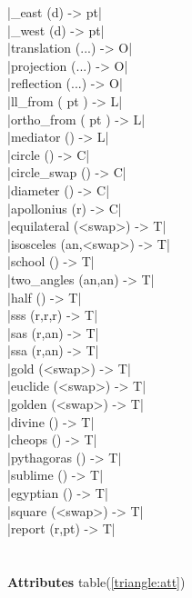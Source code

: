 \documentclass[DIV         = 14,
               fontsize    = 10,
               index       = totoc,
               twoside,
               cadre,
               headings    = small
               ]{tkz-doc}
\begin{document}
\begin{multicols}{3}
|_east (d)                 -> pt|  \\
|_west (d)                 -> pt|  \\                 
|translation (...)         -> O|   \\
|projection (...)          -> O|   \\
|reflection (...)          -> O|   \\
|ll_from ( pt )            -> L|   \\
|ortho_from ( pt )         -> L|   \\
|mediator ()               -> L|   \\
|circle ()                 -> C|   \\
|circle_swap ()            -> C|   \\
|diameter ()               -> C|   \\
|apollonius (r)            -> C|   \\                     
|equilateral (<swap>)      -> T|   \\
|isosceles (an,<swap>)     -> T|   \\
|school ()                 -> T|   \\
|two_angles (an,an)        -> T|   \\
|half ()                   -> T|   \\
|sss (r,r,r)               -> T|   \\
|sas (r,an)                -> T|   \\
|ssa (r,an)                -> T|   \\
|gold (<swap>)             -> T|   \\
|euclide (<swap>)          -> T|   \\
|golden (<swap>)           -> T|   \\
|divine ()                 -> T|   \\
|cheops ()                 -> T|   \\
|pythagoras ()             -> T|   \\
|sublime  ()               -> T|   \\
|egyptian ()               -> T|   \\
|square (<swap>)           -> T|   \\
|report (r,pt)             -> T|   \\
                                   \\
           \\
\textbf{Attributes} table(\ref{triangle:att})      \\

\end{multicols}
\end{document}
